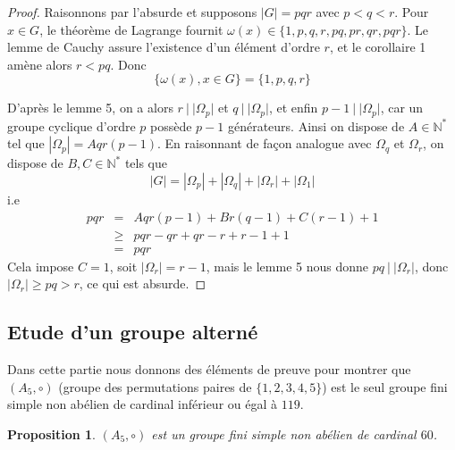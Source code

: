 \documentclass[10pt,a4paper]{article}
\newtheorem{prop}{Proposition}
\begin{document}
\begin{proof}
Raisonnons par l'absurde et supposons $|G|=pqr$ avec $p < q < r$. Pour $x \in G$, le théorème de Lagrange fournit $\omega(x) \in \{1,p,q,r,pq,pr,qr,pqr\}$. Le lemme de Cauchy assure l'existence d'un élément d'ordre $r$, et le corollaire 1 amène alors $r<pq$. Donc
$$\{\omega(x), x \in G\} = \{1,p,q,r\}$$

D'après le lemme 5, on a alors $r \: | \: |\Omega_p|$ et $q \: | \: |\Omega_p|$, et enfin $p-1 \: | \: |\Omega_p|$, car un groupe cyclique d'ordre $p$ possède $p-1$ générateurs. Ainsi on dispose de $A \in \mathbb{N}^*$ tel que $|\Omega_p| = Aqr(p-1)$. En raisonnant de façon analogue avec $\Omega_q$ et $\Omega_r$, on dispose de $B,C \in \mathbb{N}^*$ tels que
$$|G| = |\Omega_p| + |\Omega_q| + |\Omega_r| + |\Omega_1|$$
i.e
\begin{eqnarray*}
 pqr &=& Aqr(p-1) + Br(q-1) + C(r-1) + 1 \\
     &\geq & pqr - qr + qr - r + r - 1 + 1 \\
     &=& pqr     
\end{eqnarray*}      
Cela impose $C = 1$, soit $|\Omega_r|= r-1 $, mais le lemme 5 nous donne $ pq \: | \: |\Omega_r| $, donc $|\Omega_r| \geq pq > r$, ce qui est absurde.   
       

\end{proof}
 
\subsection{Etude d'un groupe alterné}
Dans cette partie nous donnons des éléments de preuve pour montrer que $(A_5,\circ)$ (groupe des permutations paires de $\{1,2,3,4,5\}$) est le seul groupe fini simple non abélien de cardinal inférieur ou égal à $119$.

\begin{prop}
$(A_5,\circ)$ est un groupe fini simple non abélien de cardinal $60$.
\end{prop}
\end{document}
